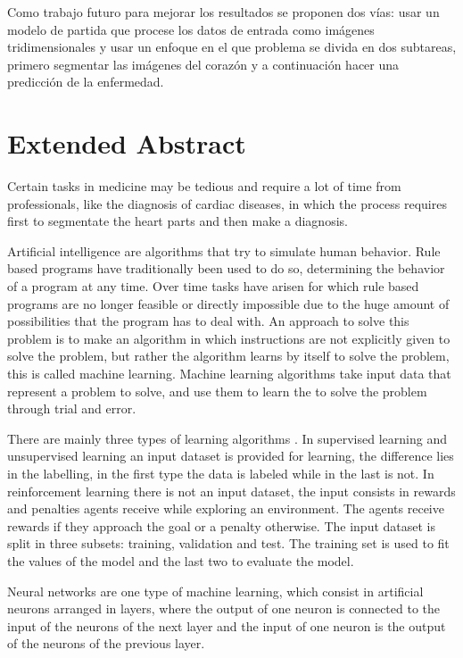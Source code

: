 \documentclass[12pt,a4paper]{article}
\begin{document}
Como trabajo futuro para mejorar los resultados se proponen dos vías: usar un modelo de partida que procese los datos de entrada como imágenes tridimensionales y usar un enfoque en el que problema se divida en dos subtareas, primero segmentar las imágenes del corazón y a continuación hacer una predicción de la enfermedad.

\newpage
\section*{Extended Abstract}
Certain tasks in medicine may be tedious and require a lot of time from professionals, like the diagnosis of cardiac diseases, in which the process requires first to segmentate the heart parts and then make a diagnosis.
\bigskip

Artificial intelligence are algorithms \cite{wiki:ai} that try to simulate human behavior. Rule based programs have traditionally been used to do so, determining the behavior of a program at any time. Over time tasks have arisen for which rule based programs are no longer feasible or directly impossible due to the huge amount of possibilities that the program has to deal with. An approach to solve this problem is to make an algorithm in which instructions are not explicitly given to solve the problem, but rather the algorithm learns by itself to solve the problem, this is called machine learning. Machine learning \cite{wiki:ml} algorithms take input data that represent a problem to solve, and use them to learn the to solve the problem through trial and error.
\bigskip

There are mainly three types of learning algorithms \cite{wiki:ml} . In supervised learning and unsupervised learning an input dataset is provided for learning, the difference lies in the labelling, in the first type the data is labeled while in the last is not. In reinforcement learning there is not an input dataset, the input consists in rewards and penalties agents receive while exploring an environment. The agents receive rewards if they approach the goal or a penalty otherwise. The input dataset is split in three subsets: training, validation and test. The training set is used to fit the values of the model and the last two to evaluate the model.
\bigskip

Neural networks \cite{wiki:ann} are one type of machine learning, which consist in artificial neurons arranged in layers, where the output of one neuron is connected to the input of the neurons of the next layer and the input of one neuron is the output of the neurons of the previous layer.
\bigskip
\end{document}
